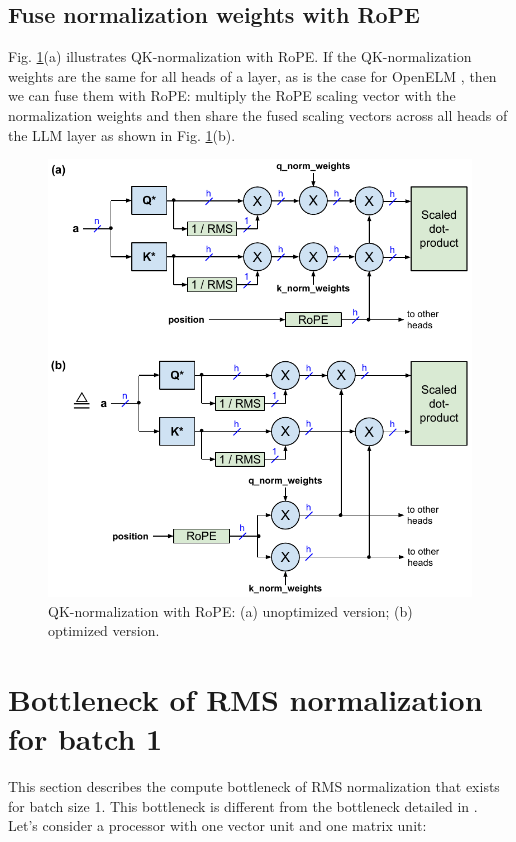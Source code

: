 \documentclass{article}
\numberwithin{equation}{section} %
\begin{document}
\subsection{Fuse normalization weights with RoPE}
Fig. \ref{fig7}(a) illustrates QK-normalization with RoPE. If the QK-normalization weights are the same for all heads of a layer, as is the case for OpenELM \citep{openelm}, then we can fuse them with RoPE: multiply the RoPE scaling vector with the normalization weights and then share the fused scaling vectors across all heads of the LLM layer as shown in Fig. \ref{fig7}(b).

\begin{figure}[h!] \centering
  \includegraphics[scale=0.9]{figs/flash_fig7.pdf}
  \caption{QK-normalization with RoPE: (a) unoptimized version; (b) optimized version.}
\label{fig7} \end{figure}

\section{Bottleneck of RMS normalization for batch 1}
This section describes the compute bottleneck of RMS normalization that exists for batch size 1. This bottleneck is different from the bottleneck detailed in \citep{openelm}. Let’s consider a processor with one vector unit and one matrix unit:
\end{document}
